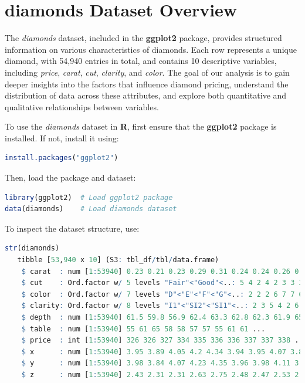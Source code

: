 \documentclass[
  11pt,
]{book}
\theoremstyle{definition}
\theoremstyle{definition}
\theoremstyle{definition}
\theoremstyle{definition}
\theoremstyle{remark}
\begin{document}
\section{diamonds Dataset Overview}\label{Data-pre-diamonds}

The \emph{diamonds} dataset, included in the \textbf{ggplot2} package, provides structured information on various characteristics of diamonds. Each row represents a unique diamond, with 54,940 entries in total, and contains 10 descriptive variables, including \emph{price}, \emph{carat}, \emph{cut}, \emph{clarity}, and \emph{color}. The goal of our analysis is to gain deeper insights into the factors that influence diamond pricing, understand the distribution of data across these attributes, and explore both quantitative and qualitative relationships between variables.

To use the \emph{diamonds} dataset in \textbf{R}, first ensure that the \textbf{ggplot2} package is installed. If not, install it using:

\begin{lstlisting}[language=R]
install.packages("ggplot2") 
\end{lstlisting}

Then, load the package and dataset:

\begin{lstlisting}[language=R]
library(ggplot2)  # Load ggplot2 package
data(diamonds)    # Load diamonds dataset
\end{lstlisting}

To inspect the dataset structure, use:

\begin{lstlisting}[language=R]
str(diamonds)   
   tibble [53,940 x 10] (S3: tbl_df/tbl/data.frame)
    $ carat  : num [1:53940] 0.23 0.21 0.23 0.29 0.31 0.24 0.24 0.26 0.22 0.23 ...
    $ cut    : Ord.factor w/ 5 levels "Fair"<"Good"<..: 5 4 2 4 2 3 3 3 1 3 ...
    $ color  : Ord.factor w/ 7 levels "D"<"E"<"F"<"G"<..: 2 2 2 6 7 7 6 5 2 5 ...
    $ clarity: Ord.factor w/ 8 levels "I1"<"SI2"<"SI1"<..: 2 3 5 4 2 6 7 3 4 5 ...
    $ depth  : num [1:53940] 61.5 59.8 56.9 62.4 63.3 62.8 62.3 61.9 65.1 59.4 ...
    $ table  : num [1:53940] 55 61 65 58 58 57 57 55 61 61 ...
    $ price  : int [1:53940] 326 326 327 334 335 336 336 337 337 338 ...
    $ x      : num [1:53940] 3.95 3.89 4.05 4.2 4.34 3.94 3.95 4.07 3.87 4 ...
    $ y      : num [1:53940] 3.98 3.84 4.07 4.23 4.35 3.96 3.98 4.11 3.78 4.05 ...
    $ z      : num [1:53940] 2.43 2.31 2.31 2.63 2.75 2.48 2.47 2.53 2.49 2.39 ...
\end{lstlisting}
\end{document}
